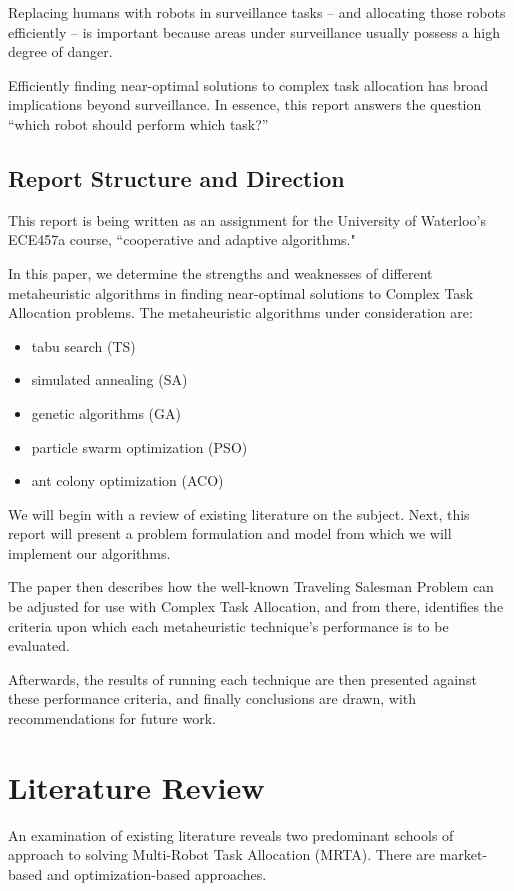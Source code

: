 \documentclass[a4paper]{article}
\begin{document}
Replacing humans with robots in surveillance tasks -- and allocating those robots efficiently -- is important because areas under surveillance usually possess a high degree of danger.

Efficiently finding near-optimal solutions to complex task allocation has broad implications beyond surveillance. In essence, this report answers the question ``which robot should perform which task?''\cite{Badreldin}


\subsection{Report Structure and Direction}

This report is being written as an assignment for the University of Waterloo's ECE457a course, ``cooperative and adaptive algorithms."

In this paper, we determine the strengths and weaknesses of different metaheuristic algorithms in finding near-optimal solutions to Complex Task Allocation problems. The metaheuristic algorithms under consideration are:
\begin{itemize}
\item tabu search (TS)
\item simulated annealing (SA)
\item genetic algorithms (GA)
\item particle swarm optimization (PSO)
\item ant colony optimization (ACO)
\end{itemize}

We will begin with a review of existing literature on the subject. Next, this report will present a problem formulation and model from which we will implement our algorithms.

The paper then describes how the well-known Traveling Salesman Problem can be adjusted for use with Complex Task Allocation, and from there, identifies the criteria upon which each metaheuristic technique's performance is to be evaluated.

Afterwards, the results of running each technique are then presented against these performance criteria, and finally conclusions are drawn, with recommendations for future work.

\newpage
\section{Literature Review}

An examination of existing literature reveals two predominant schools of approach to solving Multi-Robot Task Allocation (MRTA). There are market-based and optimization-based approaches.
\end{document}
